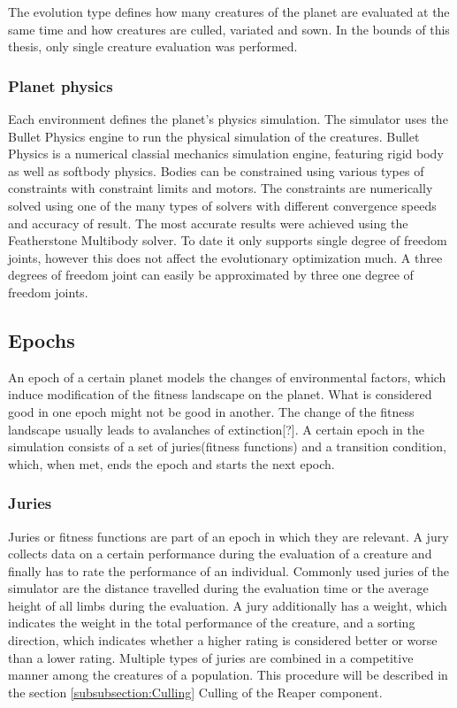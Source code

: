 \documentclass[main]{subfiles}
\begin{document}
The evolution type defines how many creatures of the planet are evaluated at the same time and how creatures are culled, variated and sown. In the bounds of this thesis, only single creature evaluation was performed. 

\subsubsection{Planet physics}

Each environment defines the planet's physics simulation. The simulator uses the Bullet Physics engine\cite{bulletphysics} to run the physical simulation of the creatures. Bullet Physics is a numerical classial mechanics simulation engine, featuring rigid body as well as softbody physics. Bodies can be constrained using various types of constraints with constraint limits and motors. The constraints are numerically solved using one of the many types of solvers with different convergence speeds and accuracy of result. The most accurate results were achieved using the Featherstone Multibody solver. To date it only supports single degree of freedom joints, however this does not affect the evolutionary optimization much. A three degrees of freedom joint can easily be approximated by three one degree of freedom joints.

\subsection{Epochs}

An epoch of a certain planet models the changes of environmental factors, which induce modification of the fitness landscape on the planet. What is considered good in one epoch might not be good in another. The change of the fitness landscape usually leads to avalanches of extinction[?]. A certain epoch in the simulation consists of a set of juries(fitness functions) and a transition condition, which, when met, ends the epoch and starts the next epoch.

\subsubsection{Juries}

Juries or fitness functions are part of an epoch in which they are relevant. A jury collects data on a certain performance during the evaluation of a creature and finally has to rate the performance of an individual. Commonly used juries of the simulator are the distance travelled during the evaluation time or the average height of all limbs during the evaluation. A jury additionally has a weight, which indicates the weight in the total performance of the creature, and a sorting direction, which indicates whether a higher rating is considered better or worse than a lower rating. Multiple types of juries are combined in a competitive manner among the creatures of a population. This procedure will be described in the section \ref{subsubsection:Culling} Culling of the Reaper component.
\end{document}
